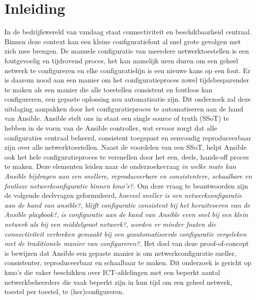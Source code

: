 


% 

\section{Inleiding}%
\label{sec:inleiding}

In de bedrijfswereld van vandaag staat connectiviteit en beschikbaarheid centraal. Binnen deze context kan een kleine configuratiefout al snel grote gevolgen met zich mee brengen. De manuele configuratie van meerdere netwerktoestellen is een foutgevoelig en tijdrovend proces, het kan namelijk uren duren om een geheel netwerk te configureren en elke configuratielijn is een nieuwe kans op een fout.
Er is daarom nood aan een manier om het configuratieproces zowel tijdsbesparender te maken als een manier die alle toestellen consistent en foutloos kan configureren, een gepaste oplossing zou automatisatie zijn.
Dit onderzoek zal deze uitdaging aanpakken door het configuratieproces te automatiseren aan de hand van Ansible. Ansible stelt ons in staat een single source of truth (SSoT) te hebben in de vorm van de Ansible controller, wat ervoor zorgt dat alle configuraties centraal beheerd, consistent toegepast en eenvoudig reproduceerbaar zijn over alle netwerktoestellen.
Naast de voordelen van een SSoT, helpt Ansible ook het hele configuratieproces te versnellen door het een, deels, hands-off proces te maken.
Deze elementen leiden naar de onderzoeksvraag \textit{in welke mate kan Ansible bijdragen aan een snellere, reproduceerbare en consistentere, schaalbare en foutloze netwerkconfiguratie binnen kmo's?}.
Om deze vraag te beantwoorden zijn de volgende deelvragen geformuleerd, \textit{hoeveel sneller is een netwerkconfiguratie aan de hand van ansible?}, \textit{blijft configuratie consistent bij het heruitvoeren van de Ansible playbook?}, \textit{is configuratie aan de hand van Ansible even snel bij een klein netwerk als bij een middelgroot netwerk?}, \textit{worden er minder fouten die connectiviteit verbreken gemaakt bij een geautomatiseerde configuratie vergeleken met de traditionele manier van configureren?}.
Het doel van deze proof-of-concept is bewijzen dat Ansible een gepaste manier is om netwerkconfiguratie sneller, consistenter, reproduceerbaar en schaalbaar te maken.
Dit onderzoek is gericht op kmo's die vaker beschikken over ICT-afdelingen met een beperkt aantal netwerkbeheerders die vaak beperkt zijn in hun tijd om een geheel netwerk, toestel per toestel, te (her)configureren.


